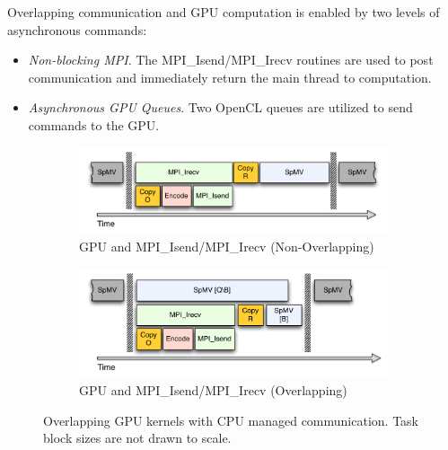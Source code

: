 
Overlapping communication and GPU computation is enabled by two levels of asynchronous commands: 
\begin{itemize} 
\item \emph{Non-blocking MPI}. The MPI\_Isend/MPI\_Irecv routines are used to post communication and immediately return the main thread to computation. 
\item \emph{Asynchronous GPU Queues}. Two OpenCL queues are utilized to send commands to the GPU. 
\end{itemize}

 
\begin{figure} 
\centering
\begin{subfigure}{0.48\textwidth}
\centering
\includegraphics[width=\textwidth]{../figures/omnigraffle/GPU_IsendIrecv.pdf}
\caption{GPU and MPI\_Isend/MPI\_Irecv (Non-Overlapping)}
\label{fig:isendirecv_gpu}
\end{subfigure}
\quad
\begin{subfigure}{0.48\textwidth}
\centering
\includegraphics[width=\textwidth]{../figures/omnigraffle/GPU_OverlapGPU.pdf}
\caption{GPU and MPI\_Isend/MPI\_Irecv (Overlapping)}
\label{fig:overlap_gpu}
\end{subfigure}
\caption{Overlapping GPU kernels with CPU managed communication. Task block sizes are not drawn to scale.} 
\label{fig:gpu_mpi_tuning}
\end{figure}




